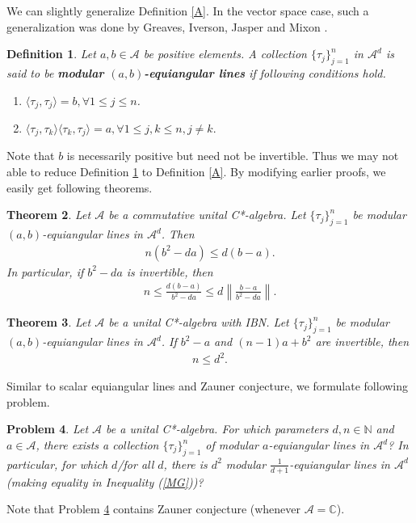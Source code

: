 \documentclass{amsart}
\newtheorem{theorem}{Theorem}[section]
\newtheorem{definition}[theorem]{Definition}
\newtheorem{problem}[theorem]{Problem}
\begin{document}
We can slightly generalize Definition \ref{A}. In the vector space case, such a generalization was done by Greaves,  Iverson, Jasper and Mixon \cite{GREAVESIVERSONJASPERMIXON}.
\begin{definition}\label{AB}
Let $a, b \in \mathcal{A}$ be  positive elements.   A collection $\{\tau_j\}_{j=1}^n$ in  $\mathcal{A}^d$  is said to be \textbf{modular $(a,b)$-equiangular  lines} if following conditions hold.
\begin{enumerate}[\upshape(i)]
	\item $	\langle \tau_j, \tau_j \rangle =b,  \forall 1\leq j \leq n$.
	\item $	\langle\tau_j, \tau_k \rangle\langle\tau_k, \tau_j \rangle=a,  \forall 	1\leq j , k \leq n , j\neq k.$
\end{enumerate}	
\end{definition}
Note that $b$ is necessarily positive but need not be invertible. Thus we may not able to reduce Definition \ref{AB} to Definition \ref{A}. By modifying earlier proofs, we easily get following theorems. 
\begin{theorem}
Let $\mathcal{A}$ be a commutative unital C*-algebra. 	Let $\{\tau_j\}_{j=1}^n$  	be modular  $(a,b)$-equiangular  lines in $\mathcal{A}^d$.
Then 
\begin{align*}
	n(b^2-da) \leq d(b-a).
\end{align*}
In particular, if $b^2-da$ is invertible, then 
\begin{align*}
	n\leq \frac{d(b-a)}{b^2-da}\leq d \left\|\frac{b-a}{b^2-da}\right\|.
\end{align*}	
\end{theorem}
\begin{theorem}
	Let $\mathcal{A}$ be a  unital C*-algebra with IBN. Let $\{\tau_j\}_{j=1}^n$  	be  modular $(a,b)$-equiangular  lines in $\mathcal{A}^d$. If $b^2-a$ and $(n-1)a+b^2$ are invertible, then
	\begin{align*}
		n \leq d^2.
	\end{align*}	
\end{theorem}
Similar to scalar  equiangular lines and Zauner conjecture, we formulate following problem.
\begin{problem}\label{NZ}
Let $\mathcal{A}$ be a  unital C*-algebra.	For which parameters $d, n \in \mathbb{N}$ and $a \in \mathcal{A}$, there exists a collection $\{\tau_j\}_{j=1}^n$  of  modular $a$-equiangular lines in $\mathcal{A}^d$? In particular, for which $d$/for all $d$, there is $d^2$ modular $\frac{1}{d+1}$-equiangular lines in $\mathcal{A}^d$ (making equality in Inequality (\ref{MG}))?
\end{problem}
Note that Problem \ref{NZ} contains Zauner conjecture (whenever $\mathcal{A}=\mathbb{C}$).
\end{document}
